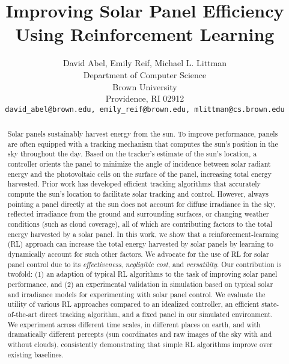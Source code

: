 \documentclass{article}
\title{Improving Solar Panel Efficiency Using Reinforcement Learning}
\author{
David Abel, Emily Reif, Michael L. Littman \\
Department of Computer Science\\
Brown University \\
Providence, RI 02912 \\
\texttt{david\_abel@brown.edu, emily\_reif@brown.edu, mlittman@cs.brown.edu} \\
}
\begin{document}
\maketitle


\begin{abstract}
Solar panels sustainably harvest energy from the sun. To improve performance, panels are often equipped with a tracking mechanism that computes the sun's position in the sky throughout the day. Based on the tracker's estimate of the sun's location, a controller orients the panel to minimize the angle of incidence between solar radiant energy and the photovoltaic cells on the surface of the panel, increasing total energy harvested. Prior work has developed efficient tracking algorithms that accurately compute the sun's location to facilitate solar tracking and control.
%
However, always pointing a panel directly at the sun does not account for diffuse irradiance in the sky, reflected irradiance from the ground and surrounding surfaces, or changing weather conditions (such as cloud coverage), all of which are contributing factors to the total energy harvested by a solar panel.
%
In this work, we show that a reinforcement-learning (RL) approach can increase the total energy harvested by solar panels by learning to dynamically account for such other factors. We advocate for the use of RL for solar panel control due to its {\it effectiveness}, {\it negligible cost}, and {\it versatility}. Our contribution is twofold: (1) an adaption of typical RL algorithms to the task of improving solar panel performance, and (2) an experimental validation in simulation based on typical solar and irradiance models for experimenting with solar panel control.
%
We evaluate the utility of various RL approaches compared to an idealized controller, an efficient state-of-the-art direct tracking algorithm, and a fixed panel in our simulated environment. We experiment across different time scales, in different places on earth, and with dramatically different percepts (sun coordinates and raw images of the sky with and without clouds), consistently demonstrating that simple RL algorithms improve over existing baselines.
\end{abstract}




\newpage
\end{document}
